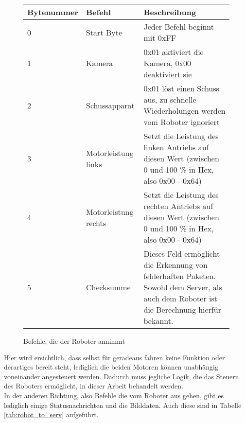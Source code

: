 \begin{figure}[!h]
\begin{tabular}{||p{}||p{}||p{}||}
	\hline Bytenummer & Befehl & Beschreibung \\ 
	\hline 0 & Start Byte &  Jeder Befehl beginnt mit 0xFF\\ 
	\hline 1 & Kamera & 0x01 aktiviert die Kamera, 0x00 deaktiviert sie \\ 
	\hline 2 & Schussapparat & 0x01 löst einen Schuss aus, zu schnelle Wiederholungen werden vom Roboter ignoriert \\ 
	\hline 3 & Motorleistung links & Setzt die Leistung des linken Antriebs auf diesen Wert (zwischen 0 und 100 \% in Hex, also 0x00 - 0x64) \\ 
	\hline 4 & Motorleistung rechts & Setzt die Leistung des rechten Antriebs auf diesen Wert (zwischen 0 und 100 \% in Hex, also 0x00 - 0x64) \\ 
	\hline 5 & Checksumme & Dieses Feld ermöglicht die Erkennung von fehlerhaften Paketen. Sowohl dem Server, als auch dem Roboter ist die Berechnung hierfür bekannt. \\
	\hline
\end{tabular}  
\caption{Befehle, die der Roboter annimmt}
\label{tab:serv_to_robot}
\end{figure}


Hier wird ersichtlich, dass selbst für geradeaus fahren keine Funktion oder derartiges bereit steht, lediglich die beiden Motoren können unabhängig voneinander angesteuert werden. Dadurch muss jegliche Logik, die das Steuern des Roboters ermöglicht, in dieser Arbeit behandelt werden. \\

In der anderen Richtung, also Befehle die vom Roboter aus gehen, gibt es lediglich einige Statusnachrichten und die Bilddaten. Auch diese sind in Tabelle \ref{tab:robot_to_serv} aufgeführt.



